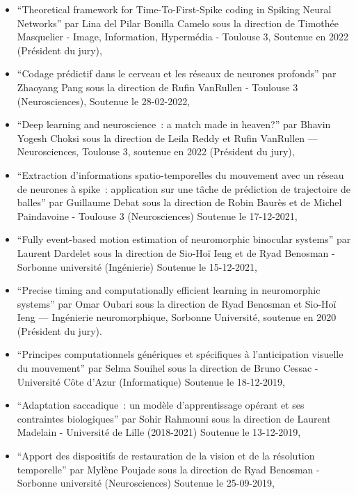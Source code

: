 \documentclass[10pt,french,a4paper,oneside]{article}%
\begin{document}
\begin{itemize}
    \item ``Theoretical framework for Time-To-First-Spike coding in Spiking Neural Networks'' par Lina del Pilar Bonilla Camelo sous la direction de Timothée Masquelier - Image, Information, Hypermédia - Toulouse 3, Soutenue en 2022 (Président du jury),

	\item ``Codage prédictif dans le cerveau et les réseaux de neurones profonds'' 	par Zhaoyang Pang sous la direction de Rufin VanRullen - Toulouse 3 (Neurosciences), Soutenue le 28-02-2022,

    \item ``Deep learning and neuroscience~: a match made in heaven?'' par Bhavin Yogesh Choksi sous la direction de Leila Reddy et Rufin VanRullen --- Neurosciences, Toulouse 3, soutenue en 2022 (Président du jury),

	\item ``Extraction d'informations spatio-temporelles du mouvement avec un réseau de neurones à spike~: application sur une tâche de prédiction de trajectoire de balles'' par Guillaume Debat sous la direction de Robin Baurès et de Michel Paindavoine - Toulouse 3  (Neurosciences) 	Soutenue le 17-12-2021,

	\item ``Fully event-based motion estimation of neuromorphic binocular systems'' par Laurent Dardelet sous la direction de Sio-Hoï Ieng et de Ryad Benosman - Sorbonne université (Ingénierie) Soutenue le 15-12-2021,

	\item ``Precise timing and computationally efficient learning in neuromorphic systems'' par Omar Oubari sous la direction de Ryad Benosman et Sio-Hoï Ieng --- Ingénierie neuromorphique, Sorbonne Université, soutenue en 2020 (Président du jury).

	\item ``Principes computationnels génériques et spécifiques à l’anticipation visuelle du mouvement'' par Selma Souihel sous la direction de Bruno Cessac - Université Côte d'Azur (Informatique) Soutenue le 18-12-2019,

	\item ``Adaptation saccadique~: un modèle d’apprentissage opérant et ses contraintes biologiques'' par Sohir Rahmouni sous la direction de Laurent Madelain - Université de Lille (2018-2021) Soutenue le 13-12-2019,

	\item ``Apport des dispositifs de restauration de la vision et de la résolution temporelle''  par Mylène Poujade sous la direction de Ryad Benosman - Sorbonne université	(Neurosciences) 	Soutenue le 25-09-2019,


\end{itemize}
\end{document}
